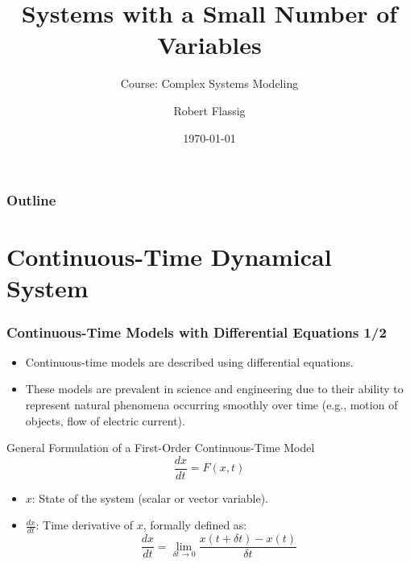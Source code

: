 \documentclass{beamer}
\title{Systems with a Small Number of
Variables}
\subtitle{Course: Complex Systems Modeling}
\author{Robert Flassig}
\institute{Brandenburg University of Applied Sciences}
\date{\today}
\begin{document}
\begin{frame}
\titlepage
\end{frame}

\begin{frame}
\frametitle{Outline}
\tableofcontents
\end{frame}

\section{Continuous-Time Dynamical System}

\begin{frame}
\frametitle{Continuous-Time Models with Differential Equations 1/2}

\begin{itemize}
	\scriptsize
    \item Continuous-time models are described using differential equations.
    \item These models are prevalent in science and engineering due to their ability to represent natural phenomena occurring smoothly over time (e.g., motion of objects, flow of electric current).
\end{itemize}

\begin{block}{General Formulation of a First-Order Continuous-Time Model}
\[
\frac{dx}{dt} = F(x, t)
\]
\begin{itemize}
    \item \(x\): State of the system (scalar or vector variable).
    \item \(\frac{dx}{dt}\): Time derivative of \(x\), formally defined as:
    \[
    \frac{dx}{dt} = \lim_{\delta t \to 0} \frac{x(t + \delta t) - x(t)}{\delta t}
    \]
\end{itemize}
\end{block}

\end{frame}
\end{document}
